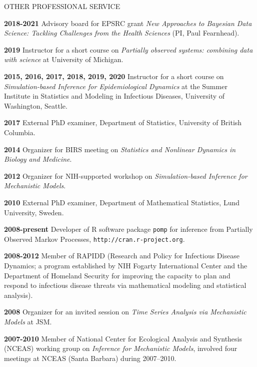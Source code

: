 \begin{mylist}{OTHER PROFESSIONAL SERVICE}

\item{\bf 2018-2021 } Advisory board for EPSRC grant {\it New Approaches to Bayesian Data Science: Tackling Challenges from the Health Sciences}  (PI, Paul Fearnhead).

\item{\bf 2019 } Instructor for a short course on {\it Partially observed systems: combining data with science} at University of Michigan.

\item{\bf 2015, 2016, 2017, 2018, 2019, 2020 } Instructor for a short course on {\it Simulation-based Inference for Epidemiological Dynamics} at the Summer Institute in Statistics and Modeling in Infectious Diseases, University of Washington, Seattle.

\item{\bf 2017 } External PhD examiner, Department of Statistics, University of British Columbia.

\item{\bf 2014 } Organizer for BIRS meeting on {\it Statistics and Nonlinear Dynamics in Biology and Medicine}.

\item{\bf 2012 } Organizer for NIH-supported workshop on {\it Simulation-based Inference for Mechanistic Models}.

\item{\bf 2010 } External PhD examiner, 
Department of Mathematical Statistics, Lund University, Sweden.

\item{\bf 2008-present } Developer of R software package {\texttt{pomp}} for inference from Partially Observed Markov Processes, {\texttt{http://cran.r-project.org}}.

\item{\bf 2008-2012 } Member of RAPIDD (Research and Policy for Infectious Disease Dynamics; a program established by NIH Fogarty International Center and the Department of Homeland Security for improving the capacity to plan and respond to infectious disease threats via mathematical modeling and statistical analysis).

\item{\bf 2008 } Organizer for an invited session on {\it Time Series Analysis via Mechanistic Models} at JSM.

\item {\bf 2007-2010 } Member of National Center for Ecological Analysis and Synthesis (NCEAS) working group on {\it Inference for Mechanistic Models}, involved four meetings at NCEAS (Santa Barbara) during 2007--2010.
 


\end{mylist}
